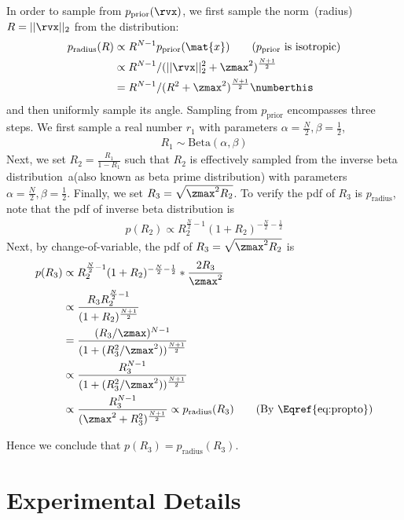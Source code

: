 In order to sample from $p_{\textrm{prior}}(\rvx)$, we first sample the norm~(radius) $R=||\rvx||_2$ from the distribution:
\begin{align*}
        p_{\textrm{radius}}(R)&\propto R^{N-1}p_{\textrm{prior}}(\mat{x})\qquad \textrm{($p_{\textrm{prior}}$ is isotropic)}\\
        &\propto R^{N-1}/{(||\rvx||_2^2+\zmax^2)^{\frac{N+1}{2}}}\\
        &= R^{N-1}/{(R^2+\zmax^2)^{\frac{N+1}{2}}} \numberthis \label{eq:propto}
\end{align*}
and then uniformly sample its angle. Sampling from $p_{\textrm{prior}}$ encompasses three steps. We first sample a real number $r_1$ with parameters $\alpha=\frac{N}{2}, \beta=\frac12$, \ie
\begin{align*}
    R_1 \sim \textrm{Beta}(\alpha, \beta)
\end{align*}
Next, we set $R_2=\frac{R_1}{1-R_1}$ such that $R_2$ is effectively sampled from the inverse beta distribution~a(also known as beta prime distribution) with parameters $\alpha=\frac{N}{2}, \beta=\frac12$. Finally, we set $R_3 = \sqrt{\zmax^2 R_2}$. To verify the pdf of $R_3$ is $p_{\textrm{radius}}$, note that the pdf of inverse beta distribution is
\begin{align*}
    p(R_2) \propto R_2^{\frac{N}{2}-1}(1+R_2)^{-\frac{N}{2}-\frac12}
\end{align*}
Next, by change-of-variable, the pdf of $R_3=\sqrt{\zmax^2 R_2}$ is
\begin{align*}
    p(R_3) &\propto R_2^{\frac{N}{2}-1}(1+R_2)^{-\frac{N}{2}-\frac12}*\frac{2R_3}{\zmax^2}\\
    &\propto\frac{R_3R_2^{\frac{N}{2}-1}}{(1+R_2)^{\frac{N+1}{2}}}\\
    &= \frac{(R_3/\zmax)^{N-1}}{(1+(R_3^2/\zmax^2))^{\frac{N+1}{2}}}\\
    &\propto  \frac{R_3^{N-1}}{(1+(R_3^2/\zmax^2))^{\frac{N+1}{2}}}\\
    &\propto  \frac{R_3^{N-1}}{(\zmax^2+R_3^2)^{\frac{N+1}{2}}} \propto p_{\textrm{radius}}(R_3)\qquad \textrm{(By \Eqref{eq:propto})}
\end{align*}

Hence we conclude that $p(R_3) = p_{\textrm{radius}}(R_3)$.

\section{Experimental Details}

